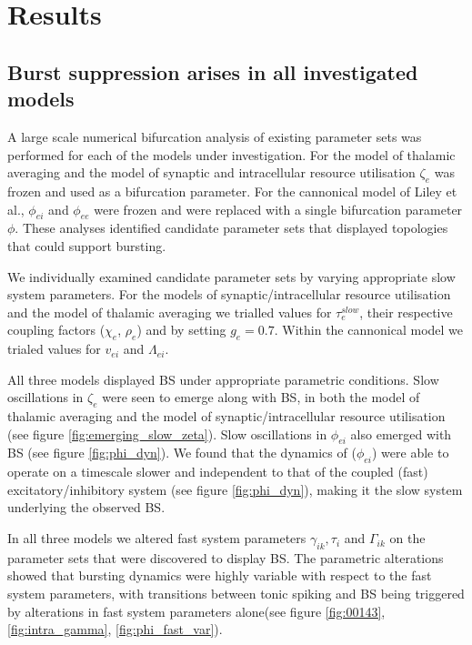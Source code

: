 \documentclass[a4paper,12pt]{article}
\begin{document}
\section{Results}

\subsection{Burst suppression arises in all investigated models}
A large scale numerical bifurcation analysis of existing parameter sets was performed for each of the models under investigation. For the model of thalamic averaging and the model of synaptic and intracellular resource utilisation $\zeta_e$ was frozen and used as a bifurcation parameter. For the cannonical model of Liley et al., $\phi_{ei}$ and $\phi_{ee}$ were frozen and were replaced with a single bifurcation parameter $\phi$. These analyses identified candidate parameter sets that displayed topologies that could support bursting.

We individually examined candidate parameter sets by varying appropriate slow system parameters. For the models of synaptic/intracellular resource utilisation and the model of thalamic averaging we trialled values for $\tau^{slow}_e$, their respective coupling factors ($\chi_{e}$, $\rho_{e}$) and by setting $g_e=0.7$. Within the cannonical model we trialed values for $v_{ei}$ and $\Lambda_{ei}$.

All three models displayed BS under appropriate parametric conditions. Slow oscillations in $\zeta_e$ were seen to emerge along with BS, in both the model of thalamic averaging and the model of synaptic/intracellular resource utilisation (see figure \ref{fig:emerging_slow_zeta}). Slow oscillations in $\phi_{ei}$ also emerged with BS (see figure \ref{fig:phi_dyn}). We found that the dynamics of ($\phi_{ei}$) were able to operate on a timescale slower and independent to that of the coupled (fast)
excitatory/inhibitory system (see figure \ref{fig:phi_dyn}), making it the slow system underlying the observed BS.

In all three models we altered fast system parameters $\gamma_{ik}, \tau_i$ and $\Gamma_{ik}$ on the parameter sets that were discovered to display BS.  The parametric alterations showed that bursting dynamics were highly variable with respect to the fast system parameters, with transitions between tonic spiking and BS being triggered by alterations in fast system parameters alone(see figure \ref{fig:00143}, \ref{fig:intra_gamma}, \ref{fig:phi_fast_var}).
\end{document}
